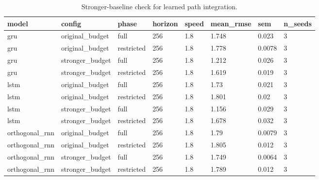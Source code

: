 \begin{table}[t]
\centering
\small
\caption{Stronger-baseline check for learned path integration.}
\label{tab:stronger-baseline}
\begin{tabular}{llllllll}
\toprule
model & config & phase & horizon & speed & mean_rmse & sem & n_seeds \\
\midrule
gru & original\_budget & full & 256 & 1.8 & 1.748 & 0.023 & 3 \\
gru & original\_budget & restricted & 256 & 1.8 & 1.778 & 0.0078 & 3 \\
gru & stronger\_budget & full & 256 & 1.8 & 1.212 & 0.026 & 3 \\
gru & stronger\_budget & restricted & 256 & 1.8 & 1.619 & 0.019 & 3 \\
lstm & original\_budget & full & 256 & 1.8 & 1.73 & 0.021 & 3 \\
lstm & original\_budget & restricted & 256 & 1.8 & 1.801 & 0.02 & 3 \\
lstm & stronger\_budget & full & 256 & 1.8 & 1.156 & 0.029 & 3 \\
lstm & stronger\_budget & restricted & 256 & 1.8 & 1.678 & 0.032 & 3 \\
orthogonal\_rnn & original\_budget & full & 256 & 1.8 & 1.79 & 0.0079 & 3 \\
orthogonal\_rnn & original\_budget & restricted & 256 & 1.8 & 1.805 & 0.012 & 3 \\
orthogonal\_rnn & stronger\_budget & full & 256 & 1.8 & 1.749 & 0.0064 & 3 \\
orthogonal\_rnn & stronger\_budget & restricted & 256 & 1.8 & 1.789 & 0.012 & 3 \\
\bottomrule
\end{tabular}
\end{table}
